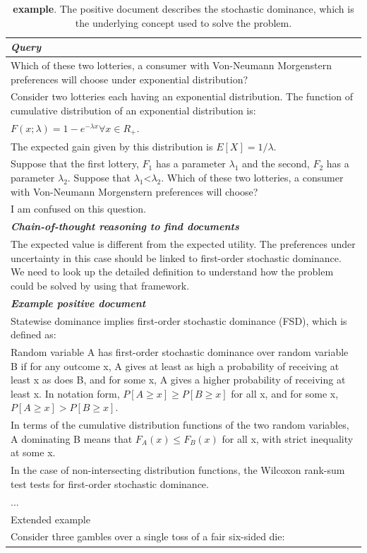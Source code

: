 \begin{table}[ht]
\caption{\textbf{\econ example}. The positive document describes the stochastic dominance, which is the underlying concept used to solve the problem.}
\centering
\begin{tabular}{p{13cm}}
\toprule
\textit{\textbf{Query}} \\
\midrule
Which of these two lotteries, a consumer with Von-Neumann Morgenstern preferences will choose under exponential distribution? \\
Consider two lotteries each having an exponential distribution. The function of cumulative distribution of an exponential distribution is: \\
$F(x;\lambda)=1-e^{-\lambda x} \forall x \in R_+.$ \\
The expected gain given by this distribution is $E[X]=1/\lambda$. \\
Suppose that the first lottery, $F_1$ has a parameter $\lambda_1$ and the second, $F_2$ has a parameter $\lambda_2$. Suppose that $\lambda_1$<$\lambda_2$. Which of these two lotteries, a consumer with Von-Neumann Morgenstern preferences will choose? \\
I am confused on this question. \\
\midrule
\textit{\textbf{Chain-of-thought reasoning to find documents}} \\
\midrule
The expected value is different from the expected utility. The preferences under uncertainty in this case should be linked to first-order stochastic dominance. We need to look up the detailed definition to understand how the problem could be solved by using that framework. \\
\midrule
\textit{\textbf{Example positive document}} \\
\midrule
Statewise dominance implies first-order stochastic dominance (FSD), which is defined as: \\
Random variable A has first-order stochastic dominance over random variable B if for any outcome x, A gives at least as high a probability of receiving at least x as does B, and for some x, A gives a higher probability of receiving at least x. In notation form, $P[A\geq x] \geq P[B\geq x]$ for all x, and for some x, $P[A\geq x] > P[B\geq x]$. \\
In terms of the cumulative distribution functions of the two random variables, A dominating B means that $F_A(x) \leq F_B(x)$ for all x, with strict inequality at some x. \\
In the case of non-intersecting distribution functions, the Wilcoxon rank-sum test tests for first-order stochastic dominance. \\
... \\
Extended example \\
Consider three gambles over a single toss of a fair six-sided die:


\end{tabular}
\end{table}
